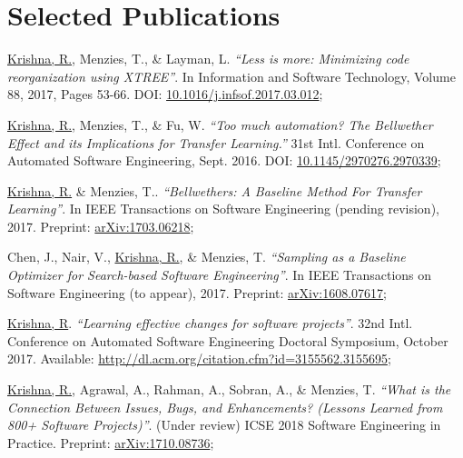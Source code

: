 \documentclass[letterpaper,9pt]{article}
\begin{document}
\section{Selected Publications}
\begin{enumerate}[label={[\arabic*]}, leftmargin=15pt]

    \item\small \underline{Krishna, R.}, Menzies, T., \& Layman, L. \textit{``Less is more: Minimizing code reorganization using XTREE''}. In Information and Software Technology, Volume 88, 2017, Pages 53-66. DOI:  \href{https://arxiv.org/abs/1609.03614}{10.1016/j.infsof.2017.03.012}\vspace{-6pt};
    
    \item\small  \underline{Krishna, R.}, Menzies, T., \& Fu, W. \textit{``Too much automation? The Bellwether Effect and its Implications for Transfer Learning.''} 31st Intl. Conference on Automated Software Engineering, Sept. 2016. DOI: \href{https://doi.org/10.1145/2970276.2970339}{10.1145/2970276.2970339}\vspace{-6pt};
    
    \item\small \underline{Krishna, R.} \& Menzies, T.. \textit{``Bellwethers: A Baseline Method For Transfer Learning''}. In IEEE Transactions on Software Engineering (pending revision), 2017. Preprint: \href{https://arxiv.org/abs/1703.06218}{arXiv:1703.06218}\vspace{-6pt};
    
    \item\small Chen, J., Nair, V., \underline{Krishna, R.}, \& Menzies, T. \textit{``Sampling as a Baseline Optimizer for Search-based Software Engineering''}. In IEEE Transactions on Software Engineering (to appear), 2017. Preprint: \href{https://arxiv.org/abs/1608.07617}{arXiv:1608.07617}\vspace{-6pt};
    
    \item\small \underline{Krishna, R}. \textit{``Learning effective changes for software projects''}. 32nd Intl. Conference on Automated Software Engineering Doctoral Symposium, October 2017. Available: \href{https://arxiv.org/abs/1708.04589}{http://dl.acm.org/citation.cfm?id=3155562.3155695}\vspace{-6pt};
    
    \item\small \underline{Krishna, R.}, Agrawal, A., Rahman, A., Sobran, A., \& Menzies, T. \textit{``What is the Connection Between Issues, Bugs, and Enhancements? (Lessons Learned from 800+ Software Projects)''}. (Under review) ICSE 2018 Software Engineering in Practice. Preprint: \href{https://arxiv.org/abs/1710.08736}{arXiv:1710.08736}\vspace{-6pt};
    

\end{enumerate}
\end{document}
